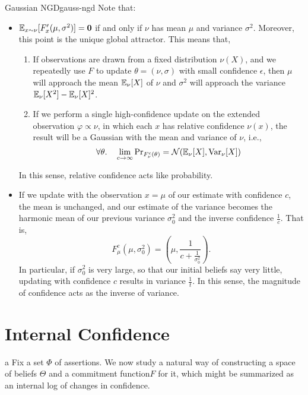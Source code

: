 \documentclass{article}
\def\cofunc{commitment function}
\begin{document}
\begin{examplex}{Gaussian NGD}{gauss-ngd}
	Note that:
	\begin{itemize}
		\item  $\operatorname*{\mathbb{E}}_{x \sim \nu} [ F'_x(\mu,\sigma^2) ] = \mathbf{0}$ if and only if $\nu$ has mean $\mu$ and variance $\sigma^2$.
		Moreover, this point is the unique global attractor.
		This means that,
		\begin{enumerate}
			\item If observations are drawn from a fixed distribution $\nu(X)$, and we repeatedly use $F$ to update $\theta = (\nu, \sigma)$ with small confidence $\epsilon$,
			then $\mu$ will approach the mean $\operatorname*{\mathbb{E}}_{\nu}[X]$ of $\nu$
			and $\sigma^2$ will approach the variance $\operatorname*{\mathbb{E}}_{\nu}[X^2] - \operatorname*{\mathbb{E}}_{\nu}[X]^2$.

			\item If we perform a single high-confidence update on the extended observation $\varphi \propto \nu$, in which each $x$ has relative confidence $\nu(x)$, the result will be a Gaussian with the mean and variance of $\nu$, i.e.,
			\[
				\forall \theta.\quad
				\lim_{c \to \infty} \Pr\nolimits_{F_{\nu}^c(\theta)} = \mathcal N(\operatorname*{\mathbb{E}}\nolimits_{\nu}[X], {\mathrm{Var}}_{\nu}[X])
			\]
		\end{enumerate}
		In this sense, relative confidence acts like probability.

		\item
		If we update with the observation $x = \mu$ of our estimate with confidence $c$,
		the mean is unchanged, and our estimate of the variance becomes the harmonic mean of our previous variance $\sigma_0^2$ and the inverse confidence $\frac1c$.
		That is,
		\[
			F^c_\mu(\mu, \sigma_0^2) =
			\left(\mu, \frac{1}{c + \frac{1}{\sigma_0^2}} \right).
		\]
		In particular, if $\sigma_0^2$ is very large, so that our initial beliefs say very little, updating with confidence $c$ results in variance $\frac1t$.
		In this sense, the magnitude of confidence acts as the inverse of variance.
	\end{itemize}
\end{examplex}


%
\section{Internal Confidence}
a
Fix a set $\Phi$ of assertions.
We now study a natural way of constructing a space of beliefs $\Theta$ and a \cofunc $F$ for it,
which might be summarized as an internal log of changes in confidence. 
\end{document}
